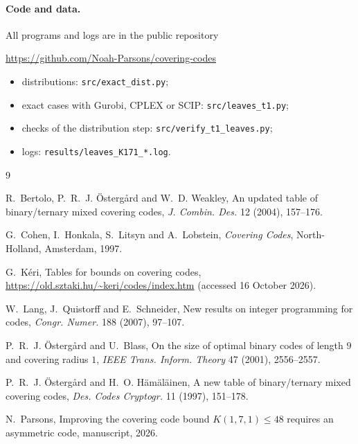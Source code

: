 \documentclass[11pt]{article}
\theoremstyle{remark}
\begin{document}
\paragraph{Code and data.} All programs and logs are in the public repository
\begin{center}\url{https://github.com/Noah-Parsons/covering-codes}\end{center}
\begin{itemize}
\item distributions: \texttt{src/exact\_dist.py};
\item exact cases with Gurobi, CPLEX or SCIP: \texttt{src/leaves\_t1.py};
\item checks of the distribution step: \texttt{src/verify\_t1\_leaves.py};
\item logs: \texttt{results/leaves\_K171\_*.log}.
\end{itemize}

\begin{thebibliography}{9}

 R.~Bertolo, P.~R.~J. Östergård and W.~D. Weakley, An updated table of
binary/ternary mixed covering codes, \emph{J. Combin. Des.} 12 (2004), 157--176.

 G.~Cohen, I.~Honkala, S.~Litsyn and A.~Lobstein, \emph{Covering Codes},
North-Holland, Amsterdam, 1997.

 G.~Kéri, Tables for bounds on covering codes,
\url{https://old.sztaki.hu/~keri/codes/index.htm} (accessed 16 October 2026).

 W.~Lang, J.~Quistorff and E.~Schneider, New results on integer programming for
codes, \emph{Congr. Numer.} 188 (2007), 97--107.

 P.~R.~J. Östergård and U.~Blass, On the size of optimal binary codes of length $9$
and covering radius $1$, \emph{IEEE Trans. Inform. Theory} 47 (2001), 2556--2557.

 P.~R.~J. Östergård and H.~O. Hämäläinen, A new table of binary/ternary mixed
covering codes, \emph{Des. Codes Cryptogr.} 11 (1997), 151--178.

 N.~Parsons, Improving the covering code bound $K(1,7,1)\le 48$ requires an
asymmetric code, manuscript, 2026.

\end{thebibliography}
\end{document}
